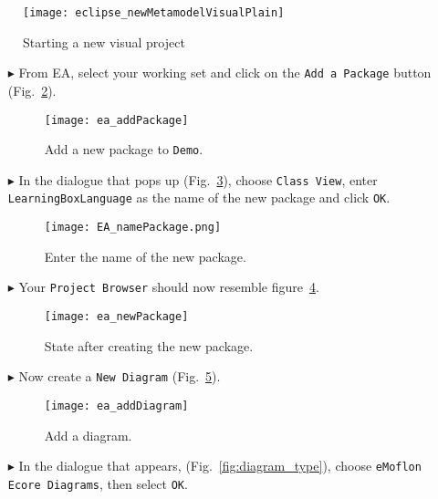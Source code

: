 \begin{figure}[htbp]
	\centering
  \texttt{[image: eclipse\_newMetamodelVisualPlain]}
	\caption{Starting a new visual project}
	\label{fig:new_visModel}
\end{figure}
\begin{itemize}

\item[$\blacktriangleright$] From EA, select your working set and click on the \texttt{Add a Package} button (Fig.~\ref{fig:new_package}).

\begin{figure}[htbp]
	\centering
  \texttt{[image: ea\_addPackage]}
	\caption{Add a new package to \texttt{Demo}.}
	\label{fig:new_package}
\end{figure}

\item[$\blacktriangleright$] In the dialogue that pops up (Fig.~\ref{fig:new_package_name}), choose \texttt{Class View}, enter \texttt{Learning\-Box\-Language}
as the name of the new package and click \texttt{OK}.

\begin{figure}[htbp]
	\centering
    \texttt{[image: EA\_namePackage.png]}
	\caption{Enter the name of the new package.}
	\label{fig:new_package_name}
\end{figure}
\FloatBarrier


\vspace{0.5cm}
\item[$\blacktriangleright$] Your \texttt{Project Browser} should now resemble figure~\ref{fig:new_package_completed}.

\begin{figure}[htbp]
	\centering
  \texttt{[image: ea\_newPackage]}
	\caption{State after creating the new package.}
	\label{fig:new_package_completed}
\end{figure}
\FloatBarrier



\item[$\blacktriangleright$] Now create a \texttt{New Diagram} (Fig.~\ref{fig:diagram}).

\vspace{0.5cm}

\begin{figure}[htbp]
	\centering
  \texttt{[image: ea\_addDiagram]}
	\caption{Add a diagram.}
	\label{fig:diagram}
\end{figure}
\FloatBarrier



\item[$\blacktriangleright$] In the dialogue that appears, (Fig.~\ref{fig:diagram_type}), choose \texttt{eMoflon Ecore Diagrams}, then select \texttt{OK}.

\end{itemize}

